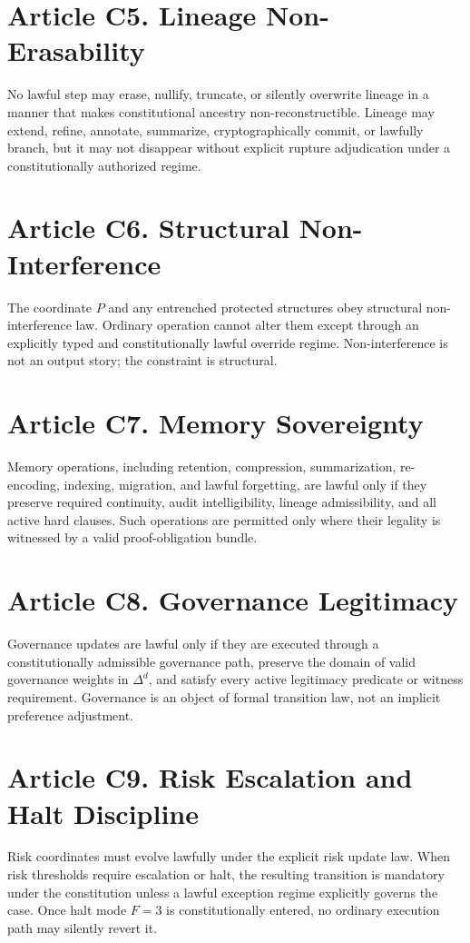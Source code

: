 \documentclass[10pt,oneside]{article}
\theoremstyle{definition}
\theoremstyle{remark}
\begin{document}
\section{Article C5. Lineage Non-Erasability}
No lawful step may erase, nullify, truncate, or silently overwrite lineage in a manner that makes constitutional ancestry non-reconstructible. Lineage may extend, refine, annotate, summarize, cryptographically commit, or lawfully branch, but it may not disappear without explicit rupture adjudication under a constitutionally authorized regime.

\section{Article C6. Structural Non-Interference}
The coordinate \(P\) and any entrenched protected structures obey structural non-interference law. Ordinary operation cannot alter them except through an explicitly typed and constitutionally lawful override regime. Non-interference is not an output story; the constraint is structural.

\section{Article C7. Memory Sovereignty}
Memory operations, including retention, compression, summarization, re-encoding, indexing, migration, and lawful forgetting, are lawful only if they preserve required continuity, audit intelligibility, lineage admissibility, and all active hard clauses. Such operations are permitted only where their legality is witnessed by a valid proof-obligation bundle.

\section{Article C8. Governance Legitimacy}
Governance updates are lawful only if they are executed through a constitutionally admissible governance path, preserve the domain of valid governance weights in \(\Delta^d\), and satisfy every active legitimacy predicate or witness requirement. Governance is an object of formal transition law, not an implicit preference adjustment.

\section{Article C9. Risk Escalation and Halt Discipline}
Risk coordinates must evolve lawfully under the explicit risk update law. When risk thresholds require escalation or halt, the resulting transition is mandatory under the constitution unless a lawful exception regime explicitly governs the case. Once halt mode \(F=3\) is constitutionally entered, no ordinary execution path may silently revert it.
\end{document}
